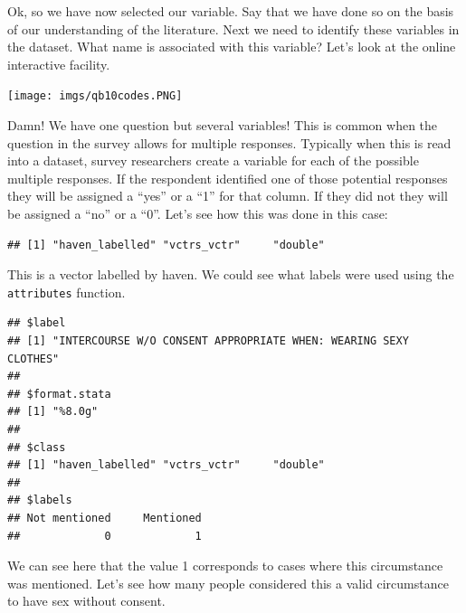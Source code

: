 \documentclass[
]{book}
\newenvironment{Shaded}{\begin{snugshade}}{\end{snugshade}}
\newcommand{\FunctionTok}[1]{\textcolor[rgb]{0.00,0.00,0.00}{#1}}
\newcommand{\NormalTok}[1]{#1}
\newcommand{\SpecialCharTok}[1]{\textcolor[rgb]{0.00,0.00,0.00}{#1}}
\begin{document}
Ok, so we have now selected our variable. Say that we have done so on the basis of our understanding of the literature. Next we need to identify these variables in the dataset. What name is associated with this variable? Let's look at the online interactive facility.

\texttt{[image: imgs/qb10codes.PNG]}

Damn! We have one question but several variables! This is common when the question in the survey allows for multiple responses. Typically when this is read into a dataset, survey researchers create a variable for each of the possible multiple responses. If the respondent identified one of those potential responses they will be assigned a ``yes'' or a ``1'' for that column. If they did not they will be assigned a ``no'' or a ``0''. Let's see how this was done in this case:

\begin{Shaded}
\end{Shaded}

\begin{verbatim}
## [1] "haven_labelled" "vctrs_vctr"     "double"
\end{verbatim}

This is a vector labelled by haven. We could see what labels were used using the \texttt{attributes} function.

\begin{Shaded}
\end{Shaded}

\begin{verbatim}
## $label
## [1] "INTERCOURSE W/O CONSENT APPROPRIATE WHEN: WEARING SEXY CLOTHES"
## 
## $format.stata
## [1] "%8.0g"
## 
## $class
## [1] "haven_labelled" "vctrs_vctr"     "double"        
## 
## $labels
## Not mentioned     Mentioned 
##             0             1
\end{verbatim}

We can see here that the value 1 corresponds to cases where this circumstance was mentioned. Let's see how many people considered this a valid circumstance to have sex without consent.
\end{document}
